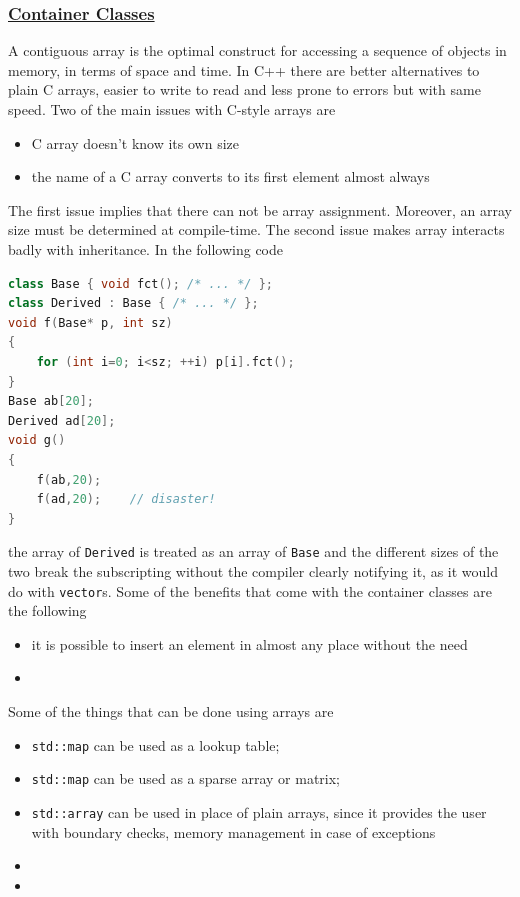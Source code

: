 \subsubsection{\href{https://isocpp.org/wiki/faq/containers}{Container Classes}}
A contiguous array is the optimal construct for accessing a sequence of 
objects in memory, in terms of space and time.
\newline
In C++ there are better alternatives to plain C arrays, easier to write 
to read and less prone to errors but with same speed. Two of the main 
issues with C-style arrays are
\begin{itemize}
    \item C array doesn't know its own size
    \item the name of a C array converts to its first element almost always
\end{itemize}
The first issue implies that there can not be array assignment. Moreover, 
an array size must be determined at compile-time.
\newline
The second issue makes array interacts badly with inheritance. In the 
following code
\begin{lstlisting}[language=C++]
class Base { void fct(); /* ... */ };
class Derived : Base { /* ... */ };
void f(Base* p, int sz)
{
    for (int i=0; i<sz; ++i) p[i].fct();
}
Base ab[20];
Derived ad[20];
void g()
{
    f(ab,20);
    f(ad,20);    // disaster!
}
\end{lstlisting}
the array of \texttt{Derived} is treated as an array of \texttt{Base} 
and the different sizes of the two break the subscripting without the 
compiler clearly notifying it, as it would do with \texttt{vector}s.
\newline
Some of the benefits that come with the container classes are the following
\begin{itemize}
    \item it is possible to insert an element in almost any place without 
          the need 
    \item
\end{itemize}

Some of the things that can be done using arrays are
\begin{itemize}
    \item \texttt{std::map} can be used as a lookup table;
    \item \texttt{std::map} can be used as a sparse array or matrix;
    \item \texttt{std::array} can be used in place of plain arrays, since 
          it provides the user with boundary checks, memory management 
          in case of exceptions
    \item 
    \item 
\end{itemize}


